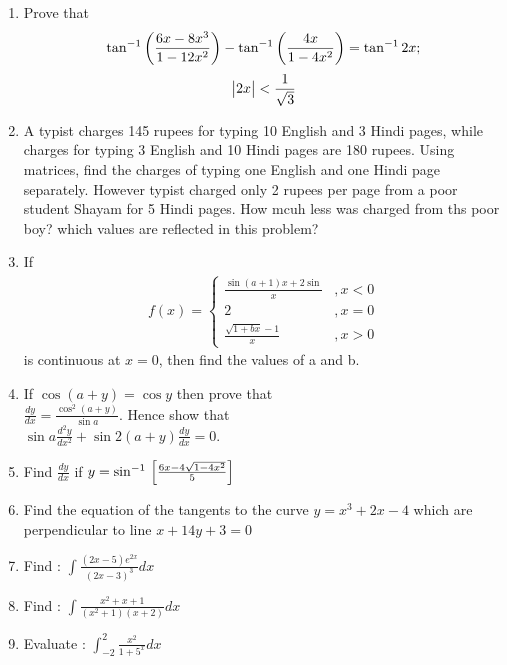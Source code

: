 \documentclass[journal,12pt,twocolumn]{IEEEtran}
\renewcommand\thesection{\arabic{section}}
\begin{document}
\begin{enumerate}[label=\thesection.\arabic*.,ref=\thesection.\theenumi]
\item Prove that 
	\begin{align}
	\tan^{-1} \left(\frac{6x-8x^{3}}{1-12x^{2}}\right) - \tan^{-1} \left(\frac{4x}{1-4x^{2}}\right) = \tan^{-1}2x;
	\end{align}
	\begin{align}
		\begin{vmatrix}2x\end{vmatrix} < \frac{1}{\sqrt{3}}
	\end{align}

\item A typist charges 145 rupees for typing 10 English and 3 Hindi pages, while charges for typing 3 English and 10 Hindi pages are 180 rupees. Using matrices, 
find the charges of typing one English and one Hindi page separately. 
However typist charged only 2 rupees per page from a poor student Shayam for 5 Hindi pages.
How mcuh less was charged from ths poor boy? which values are reflected in this problem?

\item If 
	\begin{align}
		f(x) = 
		\begin{cases}
			\frac{\sin(a+1)x + 2\sin}{x} &,x<0 \\
			2 &,x = 0\\
			\frac{\sqrt{1+bx}-1}{x} &,x>0
		\end{cases}
	\end{align}
is continuous at $x = 0$, then find the values of a and b.

\item If $\cos(a+y) = \cos y$ then prove that \\
$\frac{dy}{dx} = \frac{\cos^{2}(a+y)}{\sin a}$. 
Hence show that \\
$\sin a \frac{d^{2}y}{dx^{2}} + \sin 2(a+y)\frac{dy}{dx} = 0 $.

\item Find $\frac{dy}{dx}$ if $y = \sin^{-1}{}\left[\frac{6x - 4\sqrt{1-4x^2}}{5}\right]$ 

\item Find the equation of the tangents to the curve $y = x^3 + 2x - 4$ which are perpendicular to line $x + 14y + 3 = 0$

\item Find : $\int \frac{(2x-5)e^{2x}}{(2x-3)^3} dx$

\item Find : $\int \frac{x^2 +x +1}{(x^2 + 1)(x + 2)} dx$

\item Evaluate : $\int_{-2}^{2} \frac{x^2}{1+5^x} dx$


\end{enumerate}
\end{document}
